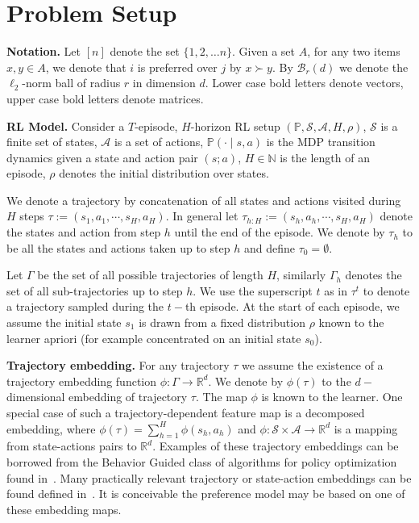 \section{Problem Setup}
\label{sec:prob}

\textbf{Notation. } Let $[n]$ denote the set $\{1,2, \ldots n\}$. Given a set $A$, for any two items $x,y \in A$, we denote that $i$ is preferred over $j$ by $x \succ y$. By ${\mathcal B}_r(d)$ we denote the $\ell_2$-norm ball of radius $r$ in dimension $d$. Lower case bold letters denote vectors, upper case bold letters denote matrices.

\textbf{RL Model.} Consider a $T$-episode, $H$-horizon RL setup $(\mathbb P, \mathcal S, \mathcal A, H, \rho)$, ${\mathcal S}$ is a finite set of states, ${\mathcal A}$ is a set of actions, $\mathbb P(\cdot \mid s,a)$ is the MDP transition dynamics given a state and action pair $(s; a)$, $H \in {\mathbb N}$ is the length of an episode, $\rho$ denotes the initial distribution over states. 

We denote a trajectory by concatenation of all states and actions visited during $H$ steps $\tau:= (s_1, a_1, \cdots , s_{H}, a_H)$. In general let $\tau_{h:H}:= (s_h, a_h, \cdots , s_{H}, a_H)$ denote the states and action from step $h$ until the end of the episode.  We denote by $\tau_h$ to be all the states and actions taken up to step $h$ and define $\tau_0 = \emptyset$.

Let $\Gamma$ be the set of all possible trajectories of length $H$, similarly $\Gamma_h$ denotes the set of all sub-trajectories up to step $h$. We use the  superscript $t$ as in $\tau^t$ to denote a trajectory sampled during the $t-$th episode. At the start of each episode, we assume the initial state $s_1$ is drawn from a fixed distribution $\rho$ known to the learner apriori (for example concentrated on an initial state $s_0$).

\textbf{Trajectory embedding.} For any trajectory $\tau$ we assume the existence of a trajectory embedding function $\phi : \Gamma  \rightarrow \mathbb{R}^d$. We denote by $\phi(\tau)$ to the $d-$dimensional embedding of trajectory $\tau$. The map $\phi$ is known to the learner. One special case of such a trajectory-dependent feature map is a decomposed embedding, where $\phi(\tau) =  \sum_{h=1}^H  \phi(s_h, a_h)$ and $\phi: \mathcal{S} \times \mathcal{A} \rightarrow \mathbb{R}^d$ is a mapping from state-actions pairs to $\mathbb{R}^d$. Examples of these trajectory embeddings can be borrowed from the Behavior Guided class of algorithms for policy optimization found in~\cite{pacchiano2020learning}. Many practically relevant trajectory or state-action embeddings can be found defined in~\cite{pacchiano2020learning,parker2020effective}. It is conceivable the preference model may be based on one of these embedding maps.

